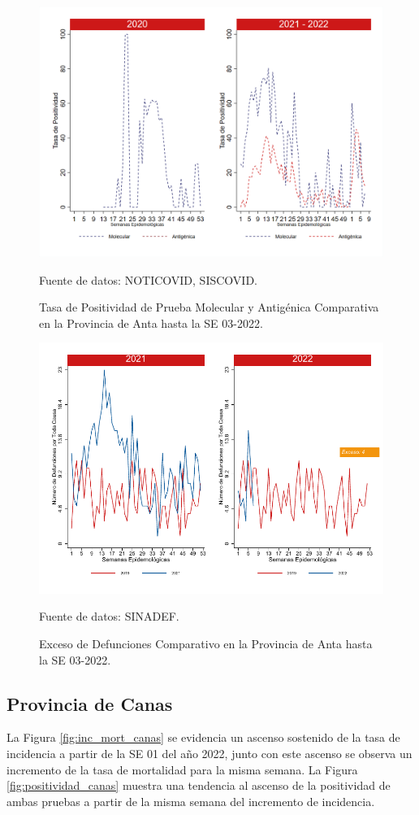 \documentclass[12pt,a4paper,openany]{book}
\begin{document}
		\begin{figure}[h]
			\caption{Tasa de Positividad de Prueba Molecular y Antigénica Comparativa en la Provincia de Anta hasta la SE 03-2022.}\label{fig:positividad_anta}
			\begin{center}
				\includegraphics[width=0.7\linewidth]{../figuras/positividad_20_21_2.png}
			\end{center}
			{\footnotesize {Fuente de datos: NOTICOVID, SISCOVID.}}
		\end{figure}
		
		\begin{figure}[h]
			\caption{Exceso de Defunciones Comparativo en la Provincia de Anta hasta la SE 03-2022.}\label{fig:exceso_anta}
			\begin{center}
				\includegraphics[width=0.7\linewidth]{../figuras/exceso_2.pdf}
			\end{center}
			{\footnotesize {Fuente de datos: SINADEF.}}
		\end{figure}
		
		\clearpage
		
		\subsection*{Provincia de Canas}
		\noindent La Figura \ref{fig:inc_mort_canas} se evidencia un ascenso sostenido de la tasa de incidencia a partir de la SE 01 del año 2022, junto con este ascenso se observa un incremento de la tasa de mortalidad para la misma semana. 
		\noindent La Figura \ref{fig:positividad_canas} muestra una tendencia al ascenso de la positividad de ambas pruebas a partir de la misma semana del incremento de incidencia. 
		
\end{document}
